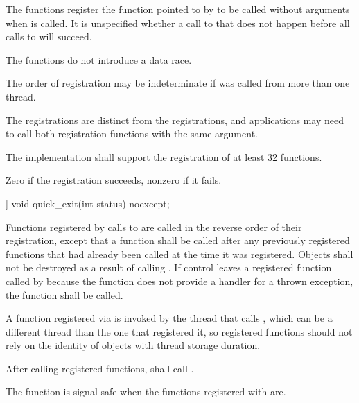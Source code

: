 \begin{itemdescr}
\pnum
\effects
The  functions register the function pointed to by 
to be called without arguments when  is called.
It is unspecified whether a call to  that does not
happen before all calls to  will succeed.
\begin{note}
The
 functions do not introduce a
data race.
\end{note}
\begin{note}
The order of registration may be indeterminate if  was called from more
than one thread.
\end{note}
\begin{note}
The
 registrations are distinct from the  registrations,
and applications may need to call both registration functions with the same argument.
\end{note}

\pnum
\implimits
The implementation shall support the registration of at least 32 functions.

\pnum
\returns
Zero if the registration succeeds, nonzero if it fails.
\end{itemdescr}

%
\begin{itemdecl}
[[noreturn]] void quick_exit(int status) noexcept;
\end{itemdecl}

\begin{itemdescr}
\pnum
\effects
Functions registered by calls to  are called in the
reverse order of their registration, except that a function shall be called after any
previously registered functions that had already been called at the time it was
registered. Objects shall not be destroyed as a result of calling .
If control leaves a registered function called by  because the
function does not provide a handler for a thrown exception, the function  shall
be called.
\begin{note}
A function registered via 
is invoked by the thread that calls ,
which can be a different thread
than the one that registered it, so registered functions should not rely on the identity
of objects with thread storage duration.
\end{note}
After calling registered functions,  shall call .

\pnum
\remarks
{}%
The function  is signal-safe
when the functions registered with  are.
\end{itemdescr}

